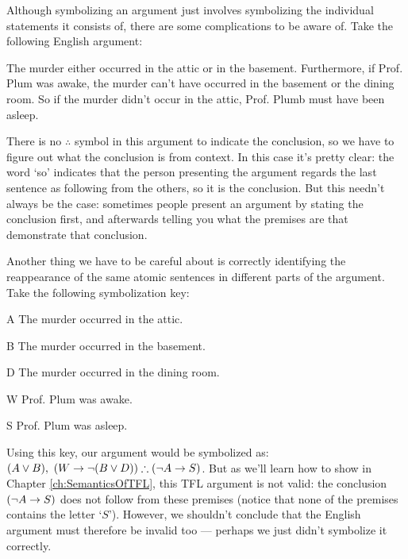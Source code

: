 Although symbolizing an argument just involves symbolizing the individual statements it consists of, there are some complications to be aware of.  Take the following English argument:
\begin{earg}
\item[] The murder either occurred in the attic or in the basement.  Furthermore, if Prof. Plum was awake, the murder can't have occurred in the basement or the dining room.  So if the murder didn't occur in the attic, Prof. Plumb must have been asleep.
\end{earg}
There is no $\therefore$ symbol in this argument to indicate the conclusion, so we have to figure out what the conclusion is from context.  In this case it's pretty clear: the word `so' indicates that the person presenting the argument regards the last sentence as following from the others, so it is the conclusion.  But this needn't always be the case: sometimes people present an argument by stating the conclusion first, and afterwards telling you what the premises are that demonstrate that conclusion.

Another thing we have to be careful about is correctly identifying the reappearance of the same atomic sentences in different parts of the argument.  Take the following symbolization key:
\begin{ekey}
  \item[A] The murder occurred in the attic.
  \item[B] The murder occurred in the basement.
  \item[D] The murder occurred in the dining room.
  \item[W] Prof. Plum was awake.
  \item[S] Prof. Plum was asleep.
\end{ekey}
Using this key, our argument would be symbolized as: $(A \vee B), \ (W \rightarrow \neg(B \vee D)) \therefore (\neg A \rightarrow S)$.  But as we'll learn how to show in Chapter \ref{ch:SemanticsOfTFL}, this TFL argument is not valid: the conclusion $ (\neg A \rightarrow S)$ does not follow from these premises (notice that none of the premises contains the letter `$S$').  However, we shouldn't conclude that the English argument must therefore be invalid too --- perhaps we just didn't symbolize it correctly.  

